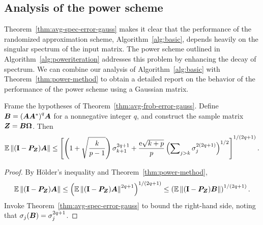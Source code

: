 \documentclass[final]{siamltex}
\begin{document}
\subsection{Analysis of the power scheme}
\label{sec:avg-power-method}

Theorem~\ref{thm:avg-spec-error-gauss} makes it clear that the
performance of the randomized approximation scheme, Algorithm~\ref{alg:basic},
depends heavily on the singular spectrum of the input matrix.
The power scheme outlined in Algorithm~\ref{alg:poweriteration} addresses this problem
by enhancing the decay of spectrum.
We can combine our analysis of Algorithm~\ref{alg:basic} with
Theorem~\ref{thm:power-method}
to obtain a detailed report on the behavior of the performance
of the power scheme using a Gaussian matrix.

\lsp

\begin{corollary} \label{cor:power-method-spec-gauss}
Frame the hypotheses of Theorem~\ref{thm:avg-frob-error-gauss}.
Define $\bm{B} = {(\bm{A}\bm{A}^*)}^{q} \bm{A}$ for a
nonnegative integer $q$, and construct the sample matrix $\bm{Z} =
\bm{B\Omega}$.  Then
$$
\operatorname{\mathbb{E}} \left\Vert {(\mathbf{I}- \bm{P}_{\bm{Z}}) \bm{A}} \right\Vert
    \leq \left[ \left( 1 + \sqrt{\frac{k}{p-1}} \right) \sigma_{k+1}^{2q+1}
    + \frac{\mathrm{e}\sqrt{k+p}}{p} \left( \sum\nolimits_{j>k} \sigma_j^{2(2q+1)} \right)^{1/2} \right]^{1/(2q+1)}.
$$
\end{corollary}

\begin{proof}
By H{\"o}lder's inequality and Theorem~\ref{thm:power-method},
$$
\operatorname{\mathbb{E}} \left\Vert {(\mathbf{I}- \bm{P}_{\bm{Z}}) \bm{A}} \right\Vert
    \leq \left( \operatorname{\mathbb{E}} \left\Vert {(\mathbf{I}- \bm{P}_{\bm{Z}}) \bm{A}} \right\Vert^{2q+1} \right)^{1/(2q+1)}
    \leq \left( \operatorname{\mathbb{E}} \left\Vert {(\mathbf{I}- \bm{P}_{\bm{Z}}) \bm{B}} \right\Vert \right)^{1/(2q+1)}.
$$
Invoke Theorem~\ref{thm:avg-spec-error-gauss} to bound the
right-hand side, noting that $\sigma_{j}(\bm{B}) = \sigma_j^{2q+1}$.
\end{proof}
\end{document}
